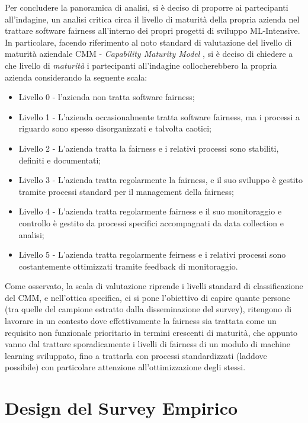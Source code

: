      Per concludere la panoramica di analisi, si è deciso di proporre ai partecipanti all'indagine, un analisi critica circa il livello di maturità della propria azienda nel trattare software fairness all'interno dei propri progetti di sviluppo ML-Intensive. In particolare, facendo riferimento al noto standard di valutazione del livello di maturità aziendale CMM - \emph{Capability Maturity Model} \cite{CMM}, si è deciso di chiedere a che livello di \emph{maturità} i partecipanti all'indagine collocherebbero la propria azienda considerando la seguente scala:
     
     \begin{itemize}
     	\item Livello 0 - l'azienda non tratta software fairness;
     	\item Livello 1 - L'azienda occasionalmente tratta software fairness, ma i processi a riguardo sono spesso disorganizzati e talvolta caotici;
     	\item Livello 2 - L'azienda tratta la fairness e i relativi processi sono stabiliti, definiti e documentati;
     	\item Livello 3 - L'azienda tratta regolarmente la fairness, e il suo sviluppo è gestito tramite processi standard per il management della fairness;
     	\item Livello 4 - L'azienda tratta regolarmente fairness e il suo monitoraggio e controllo è gestito da processi specifici accompagnati da data collection e analisi;
     	\item Livello 5 - L'azienda tratta regolarmente feirness e i relativi processi sono costantemente ottimizzati tramite feedback di monitoraggio.
     \end{itemize}
 
 	Come osservato, la scala di valutazione riprende i livelli standard di classificazione del CMM, e nell'ottica specifica, ci si pone l'obiettivo di capire quante persone (tra quelle del campione estratto dalla disseminazione del survey), ritengono di lavorare in un contesto dove effettivamente la fairness sia trattata come un requisito non funzionale prioritario in termini crescenti di maturità, che appunto vanno dal trattare sporadicamente i livelli di fairness di un modulo di machine learning sviluppato, fino a trattarla con processi standardizzati (laddove possibile) con particolare attenzione all'ottimizzazione degli stessi.
    
    \section{Design del Survey Empirico}
